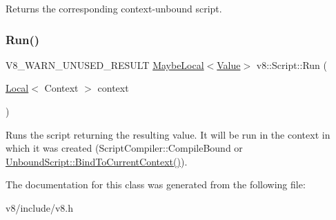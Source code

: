 Returns the corresponding context-\/unbound script. \mbox{\label{classv8_1_1Script_a37cfd598569f8b502d568a8a7a5a319b}} 
\subsubsection{\texorpdfstring{Run()}{Run()}}
{\footnotesize\ttfamily V8\+\_\+\+W\+A\+R\+N\+\_\+\+U\+N\+U\+S\+E\+D\+\_\+\+R\+E\+S\+U\+LT \mbox{\hyperlink{classv8_1_1MaybeLocal}{Maybe\+Local}}$<$\mbox{\hyperlink{classv8_1_1Value}{Value}}$>$ v8\+::\+Script\+::\+Run (\begin{DoxyParamCaption}\item[{\mbox{\hyperlink{classv8_1_1Local}{Local}}$<$ Context $>$}]{context }\end{DoxyParamCaption})}

Runs the script returning the resulting value. It will be run in the context in which it was created (Script\+Compiler\+::\+Compile\+Bound or \mbox{\hyperlink{classv8_1_1UnboundScript_a0f3354dc71e3f831d10f6e82704a4c2b}{Unbound\+Script\+::\+Bind\+To\+Current\+Context()}}). 

The documentation for this class was generated from the following file\+:\begin{DoxyCompactItemize}
\item 
v8/include/v8.\+h\end{DoxyCompactItemize}
